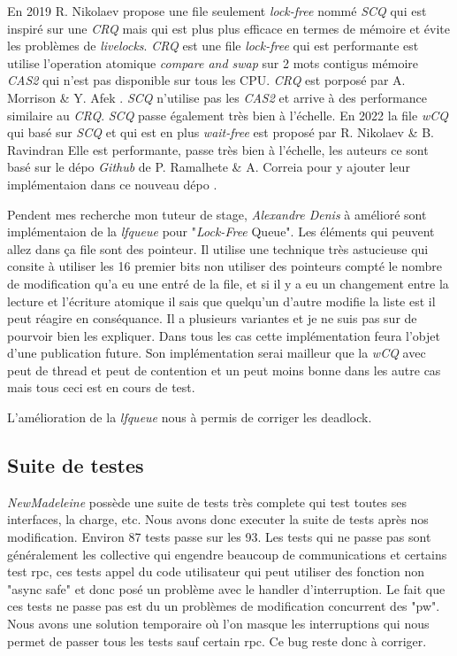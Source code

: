 En 2019 R. Nikolaev propose une file seulement \emph{lock-free} nommé \emph{SCQ} \cite{10.4230/lipics.disc.2019.28}
qui est inspiré sur une \emph{CRQ} mais qui est plus plus efficace en termes de mémoire et évite les problèmes de \emph{livelocks}.
\emph{CRQ} est une file \emph{lock-free} qui est performante est utilise l'operation atomique \emph{compare and swap}
sur 2 mots contigus mémoire \emph{CAS2} qui n'est pas disponible sur tous les CPU.
\emph{CRQ} est porposé par A. Morrison \& Y. Afek \cite{10.1145/2517327.2442527}.
\emph{SCQ} n'utilise pas les \emph{CAS2} et arrive à des performance similaire au \emph{CRQ}.
\emph{SCQ} passe également très bien à l'échelle.
En 2022 la file \emph{wCQ} qui basé sur \emph{SCQ} et qui est en plus \emph{wait-free} est proposé par R. Nikolaev \& B. Ravindran \cite{10.1145/3490148.3538572}
Elle est performante, passe très bien à l'échelle, les auteurs ce sont basé sur le dépo \emph{Github} de P. Ramalhete \& A. Correia
pour y ajouter leur implémentaion dans ce nouveau dépo \cite{wCQ}.

Pendent mes recherche mon tuteur de stage, \emph{Alexandre Denis} à amélioré sont implémentaion de la \emph{lfqueue} pour "\emph{Lock-Free} Queue".
Les éléments qui peuvent allez dans ça file sont des pointeur.
Il utilise une technique très astucieuse qui consite à utiliser les 16 premier bits non utiliser des pointeurs
compté le nombre de modification qu'a eu une entré de la file, et si il y a eu un changement entre la lecture et
l'écriture atomique il sais que quelqu'un d'autre modifie la liste est il peut réagire en conséquance.
Il a plusieurs variantes et je ne suis pas sur de pourvoir bien les expliquer.
Dans tous les cas cette implémentation feura l'objet d'une publication future.
Son implémentation serai mailleur que la \emph{wCQ} avec peut de thread et peut de contention et
un peut moins bonne dans les autre cas mais tous ceci est en cours de test.

L'amélioration de la \emph{lfqueue} nous à permis de corriger les deadlock.


\subsection{Suite de testes}

\emph{NewMadeleine} possède une suite de tests très complete qui test toutes ses interfaces, la charge, etc.
Nous avons donc executer la suite de tests après nos modification. Environ 87 tests passe sur les 93.
Les tests qui ne passe pas sont généralement les collective qui engendre beaucoup de communications et certains test rpc,
ces tests appel du code utilisateur qui peut utiliser des fonction non "async safe" et donc posé un problème avec le handler d'interruption.
Le fait que ces tests ne passe pas est du un problèmes de modification concurrent des "pw".
Nous avons une solution temporaire où l'on masque les interruptions qui nous permet de passer tous les tests sauf certain rpc.
Ce bug reste donc à corriger.

